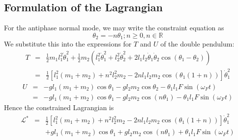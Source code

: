 \documentclass[12pt]{article}
\begin{document}
	\subsection{Formulation of the Lagrangian}
	For the antiphase normal mode, we may write the constraint equation as
	$$\theta_2 = -n\theta_1; n\geq 0, n\in\mathbb{R}$$
	We substitute this into the expressions for $T$ and $U$ of the double pendulum:
	\begin{eqnarray*}	
	T &=&\frac{1}{2}m_1l_1^2\dot{\theta}_1^2+\frac{1}{2}m_2\left(l_1^2\dot{\theta}_1^2+l_2^2\dot{\theta}_2^2+2l_1l_2\dot{\theta}_1\dot{\theta}_2\cos(\theta_1-\theta_2)\right)\\
	&=&\frac{1}{2}\left[l_1^2(m_1+m_2)+n^2l_2^2m_2-2nl_1l_2m_2\cos(\theta_1(1+n))\right]\dot{\theta}_1^2
	\end{eqnarray*}
	\begin{eqnarray*}
	U &=& -gl_1(m_1+m_2)\cos{\theta_1}-gl_2m_2\cos{\theta_2}-\theta_1l_1F\sin(\omega_Ft)\\
	&=& -gl_1(m_1+m_2)\cos{\theta_1}-gl_2m_2\cos(n\theta_1)-\theta_1l_1F\sin(\omega_Ft)
	\end{eqnarray*}
	Hence the constrained Lagrangian is
	\begin{eqnarray*}
	\mathcal{L}^*&=&\frac{1}{2}\left[l_1^2(m_1+m_2)+n^2l_2^2m_2-2nl_1l_2m_2\cos(\theta_1(1+n))\right]\dot{\theta}_1^2\\
	&&+gl_1(m_1+m_2)\cos{\theta_1}+gl_2m_2\cos(n\theta_1)+\theta_1l_1F\sin(\omega_Ft)
	\end{eqnarray*}
	
\end{document}
